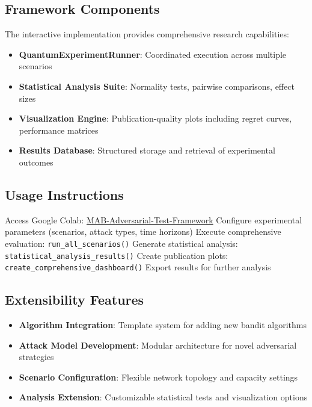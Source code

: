 \documentclass[11pt,a4paper]{article}
\begin{document}
\begin{tcolorbox}[colback=colabcolor!15,colframe=colabcolor,title=\textbf{Google Colab Framework Details}]

\subsection{Framework Components}

The interactive implementation provides comprehensive research capabilities:

\begin{itemize}
\item \textbf{QuantumExperimentRunner}: Coordinated execution across multiple scenarios
\item \textbf{Statistical Analysis Suite}: Normality tests, pairwise comparisons, effect sizes
\item \textbf{Visualization Engine}: Publication-quality plots including regret curves, performance matrices
\item \textbf{Results Database}: Structured storage and retrieval of experimental outcomes
\end{itemize}

\subsection{Usage Instructions}

\begin{algorithm}[H]
\scriptsize
\caption{Interactive Framework Usage Protocol}
\begin{algorithmic}[1]
\STATE Access Google Colab: \href{https://colab.research.google.com/drive/1LboZEQOtrOVdO93jAmYSAo-HQbBHvnCb}{MAB-Adversarial-Test-Framework}
\STATE Configure experimental parameters (scenarios, attack types, time horizons)
\STATE Execute comprehensive evaluation: \texttt{run\_all\_scenarios()}
\STATE Generate statistical analysis: \texttt{statistical\_analysis\_results()}
\STATE Create publication plots: \texttt{create\_comprehensive\_dashboard()}
\STATE Export results for further analysis
\end{algorithmic}
\end{algorithm}

\subsection{Extensibility Features}

\begin{itemize}
\item \textbf{Algorithm Integration}: Template system for adding new bandit algorithms
\item \textbf{Attack Model Development}: Modular architecture for novel adversarial strategies
\item \textbf{Scenario Configuration}: Flexible network topology and capacity settings
\item \textbf{Analysis Extension}: Customizable statistical tests and visualization options
\end{itemize}

\end{tcolorbox}
\end{document}
